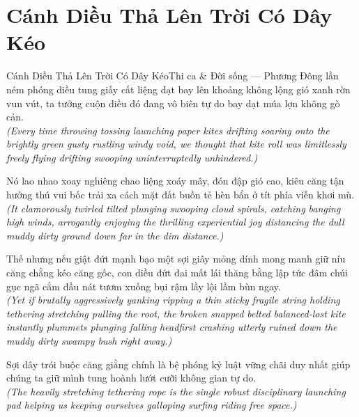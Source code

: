 \section{Cánh Diều Thả Lên Trời Có Dây Kéo}
\begin{truyen}{Cánh Diều Thả Lên Trời Có Dây Kéo}{Thi ca \& Đời sống --- Phương Đông}
 lần ném phóng diều tung giấy cất liệng dạt bay lên khoảng không lộng gió xanh rờn vun vút, ta tưởng cuộn diều đó đang vô biên tự do bay dạt múa lợn không gò cản.\\[4pt]
\textit{(Every time throwing tossing launching paper kites drifting soaring onto the brightly green gusty rustling windy void, we thought that kite roll was limitlessly freely flying drifting swooping uninterruptedly unhindered.)}

Nó lao nhao xoay nghiêng chao liệng xoáy mây, đón đập gió cao, kiêu căng tận hưởng thú vui bốc trải xa cách mặt đất buồn tẻ hèn bẩn ở tít phía viễn khơi mù.\\[4pt]
\textit{(It clamorously twirled tilted plunging swooping cloud spirals, catching banging high winds, arrogantly enjoying the thrilling experiential joy distancing the dull muddy dirty ground down far in the dim distance.)}

Thế nhưng nếu giật đứt mạnh bạo một sợi giây mỏng dính mong manh giữ níu căng chằng kéo căng gốc, con diều đứt đai mất lái thăng bằng lập tức đâm chúi gục ngã cắm đầu nát tươm xuống bụi rậm lầy lội lầm bùn ngay.\\[4pt]
\textit{(Yet if brutally aggressively yanking ripping a thin sticky fragile string holding tethering stretching pulling the root, the broken snapped belted balanced-lost kite instantly plummets plunging falling headfirst crashing utterly ruined down the muddy dirty swampy bush right away.)}

\end{truyen}
\begin{baihoc}
  Sợi dây trói buộc căng giằng chính là bệ phóng kỷ luật vững chãi duy nhất giúp chúng ta giữ mình tung hoành lướt cưỡi không gian tự do.\\[4pt]
  \textit{(The heavily stretching tethering rope is the single robust disciplinary launching pad helping us keeping ourselves galloping surfing riding free space.)}
\end{baihoc}

